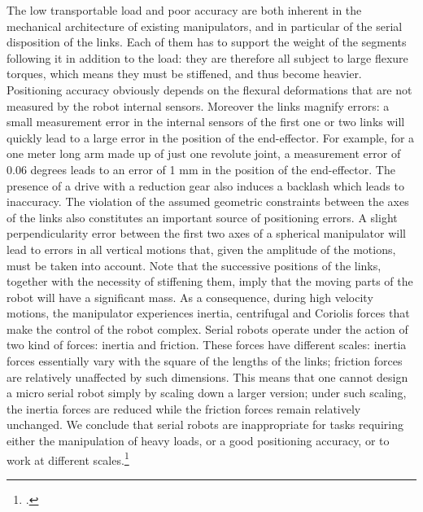 \begin{em}
The low transportable load and poor accuracy are both inherent in the
mechanical architecture of existing manipulators, and in particular of the
serial disposition of the links. Each of them has to support the weight of the
segments following it in addition to the load: they are therefore all subject
to large flexure torques, which means they must be stiffened, and thus
become heavier. Positioning accuracy obviously depends on the flexural
deformations that are not measured by the robot internal sensors. Moreover
the links magnify errors: a small measurement error in the internal sensors
of the first one or two links will quickly lead to a large error in the position
of the end-effector. For example, for a one meter long arm made up of just
one revolute joint, a measurement error of 0.06 degrees leads to an error
of 1 mm in the position of the end-effector. The presence of a drive with a
reduction gear also induces a backlash which leads to inaccuracy. The violation of the assumed geometric constraints between the axes of
the links also constitutes an important source of positioning errors. A slight
perpendicularity error between the first two axes of a spherical manipulator
will lead to errors in all vertical motions that, given the amplitude of the
motions, must be taken into account. Note that the successive positions of
the links, together with the necessity of stiffening them, imply that the moving parts of the robot will have a significant mass. As a consequence, during
high velocity motions, the manipulator experiences inertia, centrifugal and
Coriolis forces that make the control of the robot complex.
Serial robots operate under the action of two kind of forces: inertia and
friction. These forces have different scales: inertia forces essentially vary
with the square of the lengths of the links; friction forces are relatively unaffected by such dimensions. This means that one cannot design a micro
serial robot simply by scaling down a larger version; under such scaling,
the inertia forces are reduced while the friction forces remain relatively unchanged. We conclude that serial robots are inappropriate for tasks requiring either the manipulation of heavy loads, or a good positioning accuracy,
or to work at different scales.\footcite[Vgl.][4]{Merlet2006}
\end{em}

